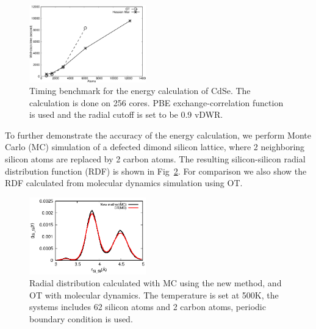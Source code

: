 \documentclass[aps,prl,twocolumn,reprint,amsmath,amssymb]{revtex4-1}
\begin{document}
\begin{figure}
\includegraphics[width=0.45\textwidth]{timing}
\caption{Timing benchmark for the energy calculation of CdSe. The calculation is done on 256 cores. PBE exchange-correlation function is used and the radial cutoff is set to be 0.9 vDWR.}
\label{fig:scaling}
\end{figure}




To further demonstrate the accuracy of the energy calculation, we perform Monte Carlo (MC) simulation of a defected dimond silicon lattice, where 2 neighboring silicon atoms are replaced by 2 carbon atoms. The resulting silicon-silicon radial distribution function (RDF) is shown in Fig~\ref{fig:mc}. For comparison we also show the RDF calculated from molecular dynamics simulation using OT. 

\begin{figure}
\includegraphics[width=0.45\textwidth]{rdf_si}
\caption{Radial distribution calculated with MC using the new method, and OT with molecular dynamics. The temperature is set at 500K, the systems includes 62 silicon atoms and 2 carbon atoms, periodic boundary condition is used.}
\label{fig:mc}
\end{figure}
\end{document}
